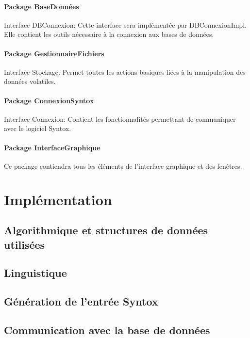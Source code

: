 \documentclass[12pt]{report}
\begin{document}
\subsubsection*{Package BaseDonnées}
Interface DBConnexion: Cette interface sera implémentée par DBConnexionImpl. Elle contient les outils nécessaire à la connexion aux bases de données.

\subsubsection*{Package GestionnaireFichiers}
Interface Stockage: Permet toutes les actions basiques liées à la manipulation des données volatiles.

\subsubsection*{Package ConnexionSyntox}
Interface Connexion: Contient les fonctionnalités permettant de communiquer avec le logiciel Syntox.

\subsubsection*{Package InterfaceGraphique}
Ce package contiendra tous les éléments de l'interface graphique et des fenêtres.



\chapter{Implémentation}

\section{Algorithmique et structures de données utilisées}

\section{Linguistique}

\section{Génération de l'entrée Syntox}

\section{Communication avec la base de données}
\end{document}
